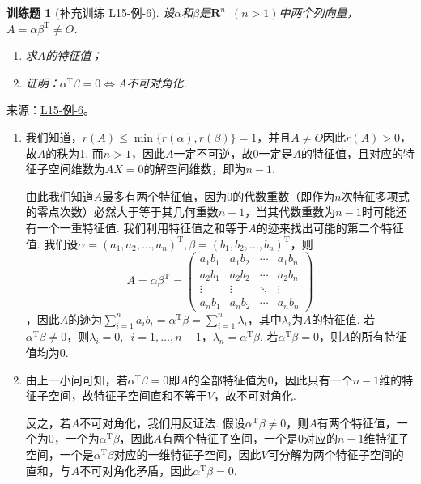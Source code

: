 \documentclass[UTF8,12pt,a4paper,fontset=fandol]{ctexart}
\newtheorem{exercise}{训练题}[section]
\begin{document}
\begin{exercise}[补充训练 L15-例-6]\label{prob:L15-例-6}
设$\alpha$和$\beta$是$\mathbf{R}^n\enspace (n>1)$中两个列向量，$A=\alpha\beta^\mathrm{T}\neq O$.
    \begin{enumerate}
        \item 求$A$的特征值；

        \item 证明：$\alpha^\mathrm{T}\beta=0\iff A$不可对角化.
    \end{enumerate}
\end{exercise}
\noindent 来源：\href{https://github.com/yhwu-is/Linear-Algebra-Left-Undone/blob/new/%E8%AE%B2%E4%B9%89/%E4%B8%93%E9%A2%98/15%20%E7%9B%B8%E4%BC%BC%E6%A0%87%E5%87%86%E5%BD%A2%EF%BC%9A%E5%A4%8D%E6%95%B0%E5%9F%9F%E4%B8%8A%E7%9A%84%E5%B0%9D%E8%AF%95%E4%B8%8E%E7%90%86%E8%AE%BA.tex}{L15-例-6}。
\begin{solve}
\begin{enumerate}
        \item 我们知道，$r(A)\leqslant\min{\{r(\alpha),r(\beta)\}}=1$，并且$A\neq O$因此$r(A)>0$，故$A$的秩为1. 而$n>1$，因此$A$一定不可逆，故0一定是$A$的特征值，且对应的特征子空间维数为$AX=0$的解空间维数，即为$n-1$.

              由此我们知道$A$最多有两个特征值，因为0的代数重数（即作为$n$次特征多项式的零点次数）必然大于等于其几何重数$n-1$，当其代数重数为$n-1$时可能还有一个一重特征值. 我们利用特征值之和等于$A$的迹来找出可能的第二个特征值. 我们设$\alpha=(a_1,a_2,\ldots,a_n)^\mathrm{T},\beta=(b_1,b_2,\ldots,b_n)^\mathrm{T}$，则
\[A=\alpha\beta^\mathrm{T}=\begin{pmatrix}
                      a_1b_1 & a_1b_2 & \cdots & a_1b_n \\
                      a_2b_1 & a_2b_2 & \cdots & a_2b_n \\
                      \vdots & \vdots & \ddots & \vdots \\
                      a_nb_1 & a_nb_2 & \cdots & a_nb_n
                  \end{pmatrix}\]
，因此$A$的迹为$\sum\limits_{i=1}^na_ib_i=\alpha^\mathrm{T}\beta=\sum\limits_{i=1}^n\lambda_i$，其中$\lambda_i$为$A$的特征值. 若$\alpha^\mathrm{T}\beta\neq 0$，则$\lambda_i=0,\enspace i=1,\ldots,n-1$，$\lambda_n=\alpha^\mathrm{T}\beta$. 若$\alpha^\mathrm{T}\beta=0$，则$A$的所有特征值均为0.

        \item 由上一小问可知，若$\alpha^\mathrm{T}\beta=0$即$A$的全部特征值为0，因此只有一个$n-1$维的特征子空间，故特征子空间直和不等于$V$，故不可对角化.

              反之，若$A$不可对角化，我们用反证法. 假设$\alpha^\mathrm{T}\beta\neq 0$，则$A$有两个特征值，一个为0，一个为$\alpha^\mathrm{T}\beta$，因此$A$有两个特征子空间，一个是0对应的$n-1$维特征子空间，一个是$\alpha^\mathrm{T}\beta$对应的一维特征子空间，因此$V$可分解为两个特征子空间的直和，与$A$不可对角化矛盾，因此$\alpha^\mathrm{T}\beta=0$.
    \end{enumerate}
\end{solve}
\end{document}
